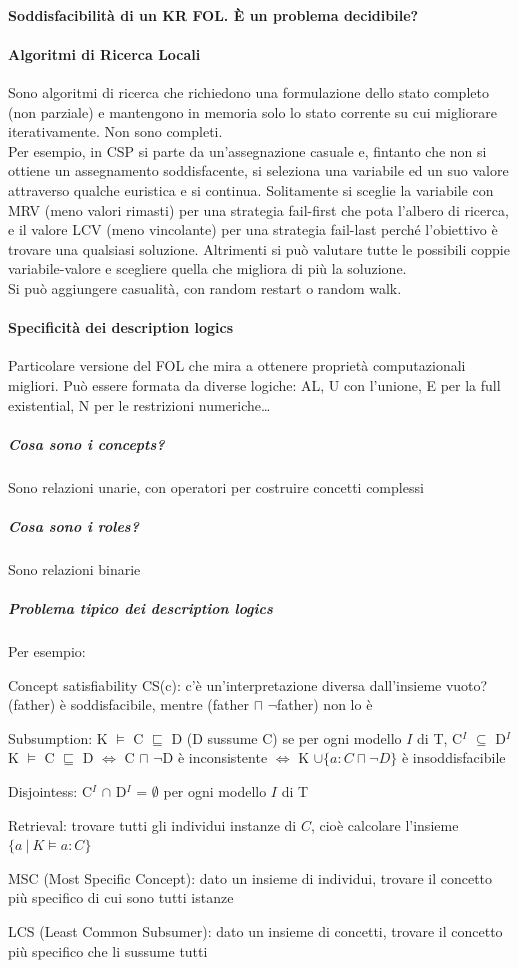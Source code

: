 \documentclass[10pt]{report}
\begin{document}
\paragraph{Soddisfacibilità di un KR FOL. È un problema decidibile?}
\paragraph{Algoritmi di Ricerca Locali} Sono algoritmi di ricerca che richiedono una formulazione dello stato completo (non parziale) e mantengono in memoria solo lo stato corrente su cui migliorare iterativamente. Non sono completi.\\
Per esempio, in CSP si parte da un'assegnazione casuale e, fintanto che non si ottiene un assegnamento soddisfacente, si seleziona una variabile ed un suo valore attraverso qualche euristica e si continua. Solitamente si sceglie la variabile con MRV (meno valori rimasti) per una strategia fail-first che pota l'albero di ricerca, e il valore LCV (meno vincolante) per una strategia fail-last perché l'obiettivo è trovare una qualsiasi soluzione. Altrimenti si può valutare tutte le possibili coppie variabile-valore e scegliere quella che migliora di più la soluzione.\\
Si può aggiungere casualità, con random restart o random walk.
\paragraph{Specificità dei description logics} Particolare versione del FOL che mira a ottenere proprietà computazionali migliori. Può essere formata da diverse logiche: AL, U con l'unione, E per la full existential, N per le restrizioni numeriche\ldots
\subparagraph{Cosa sono i concepts?} Sono relazioni unarie, con operatori per costruire concetti complessi
\subparagraph{Cosa sono i roles?} Sono relazioni binarie
\subparagraph{Problema tipico dei description logics} Per esempio:
\begin{list}{}{}
	\item Concept satisfiability CS(c): c'è un'interpretazione diversa dall'insieme vuoto?\\
	(father) è soddisfacibile, mentre (father $\sqcap$ $\neg$father) non lo è
	\item Subsumption: K $\vDash$ C $\sqsubseteq$ D (D sussume C) se per ogni modello $I$ di T, C$^I$ $\subseteq$ D$^I$\\
	 K $\vDash$ C $\sqsubseteq$ D $\Leftrightarrow$ C $\sqcap$ $\neg$D è inconsistente $\Leftrightarrow$ K $\cup\{a : C \sqcap \neg D\}$ è insoddisfacibile
	\item Disjointess: C$^I$ $\cap$ D$^I$ = $\emptyset$ per ogni modello $I$ di T
	\item Retrieval: trovare tutti gli individui instanze di $C$, cioè calcolare l'insieme $\{a\:|\:K\vDash a : C\}$
	\item MSC (Most Specific Concept): dato un insieme di individui, trovare il concetto più specifico di cui sono tutti istanze
	\item LCS (Least Common Subsumer): dato un insieme di concetti, trovare il concetto più specifico che li sussume tutti 
\end{list}
\end{document}
